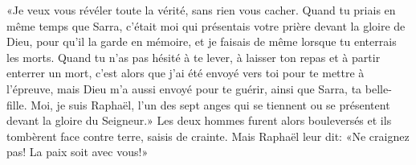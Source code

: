 «Je veux vous révéler toute la vérité, sans rien vous cacher.
Quand tu priais en même temps que Sarra,
	c’était moi qui présentais votre prière devant la gloire de Dieu,
		pour qu’il la garde en mémoire,
	et je faisais de même lorsque tu enterrais les morts.
Quand tu n’as pas hésité à te lever,
		à laisser ton repas et à partir enterrer un mort,
	c’est alors que j’ai été envoyé vers toi pour te mettre à l’épreuve,
	mais Dieu m’a aussi envoyé pour te guérir, ainsi que Sarra, ta belle-fille.
Moi, je suis Raphaël,
	l’un des sept anges qui se tiennent ou se présentent
		devant la gloire du Seigneur.»
Les deux hommes furent alors bouleversés
	et ils tombèrent face contre terre, saisis de crainte.
Mais Raphaël leur dit: «Ne craignez pas!
	La paix soit avec vous!»
